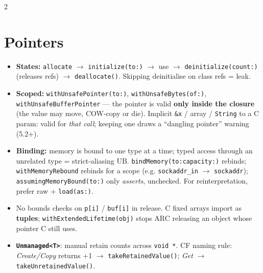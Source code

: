 \documentclass[8pt]{extarticle}
\begin{document}

\begin{multicols}{2}
\raggedright

\section{Pointers}
\begin{itemize}
  \item \textbf{States:} \texttt{allocate} $\to$ \texttt{initialize(to:)} $\to$
        use $\to$ \texttt{deinitialize(count:)} (releases refs) $\to$
        \texttt{deallocate()}. Skipping deinitialise on class refs = leak.
  \item \textbf{Scoped:} \texttt{withUnsafePointer(to:)},
        \texttt{withUnsafeBytes(of:)}, \texttt{withUnsafeBufferPointer} — the
        pointer is valid \textbf{only inside the closure} (the value may move,
        COW-copy or die). Implicit \texttt{\&x} / array / \texttt{String} to a
        C param: valid for \emph{that call}; keeping one draws a
        ``dangling pointer'' warning (5.2+).
  \item \textbf{Binding:} memory is bound to one type at a time; typed
        access through an unrelated type = strict-aliasing UB.
        \texttt{bindMemory(to:capacity:)} rebinds; \texttt{withMemoryRebound}
        rebinds for a scope (e.g. \texttt{sockaddr\_in} $\to$
        \texttt{sockaddr}); \texttt{assumingMemoryBound(to:)} only
        \emph{asserts}, unchecked. For reinterpretation, prefer raw +
        \texttt{load(as:)}.
  \item No bounds checks on \texttt{p[i]} / \texttt{buf[i]} in release.
        C fixed arrays import as \textbf{tuples}; \texttt{withExtendedLifetime(obj)}
        stops ARC releasing an object whose pointer C still uses.
  \item \textbf{\texttt{Unmanaged<T>}}: manual retain counts across
        \texttt{void *}. CF naming rule: \emph{Create/Copy} returns +1
        $\to$ \texttt{takeRetainedValue()}; \emph{Get} $\to$
        \texttt{takeUnretainedValue()}.
\end{itemize}


\end{multicols}
\end{document}
